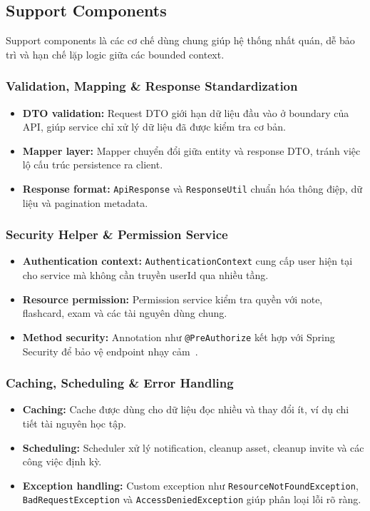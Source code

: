 \subsection{Support Components}
\label{subsec:support-components}

Support components là các cơ chế dùng chung giúp hệ thống nhất quán, dễ bảo trì và hạn chế lặp logic giữa các bounded context.

\subsubsection{Validation, Mapping \& Response Standardization}
\label{subsubsec:validation-mapping-response}

\begin{itemize}
    \item \textbf{DTO validation:} Request DTO giới hạn dữ liệu đầu vào ở boundary của API, giúp service chỉ xử lý dữ liệu đã được kiểm tra cơ bản.
    \item \textbf{Mapper layer:} Mapper chuyển đổi giữa entity và response DTO, tránh việc lộ cấu trúc persistence ra client.
    \item \textbf{Response format:} \texttt{ApiResponse} và \texttt{ResponseUtil} chuẩn hóa thông điệp, dữ liệu và pagination metadata.
\end{itemize}

\subsubsection{Security Helper \& Permission Service}
\label{subsubsec:security-permission-helper}

\begin{itemize}
    \item \textbf{Authentication context:} \texttt{AuthenticationContext} cung cấp user hiện tại cho service mà không cần truyền userId qua nhiều tầng.
    \item \textbf{Resource permission:} Permission service kiểm tra quyền với note, flashcard, exam và các tài nguyên dùng chung.
    \item \textbf{Method security:} Annotation như \texttt{@PreAuthorize} kết hợp với Spring Security để bảo vệ endpoint nhạy cảm~\cite{springsecurityjwt}.
\end{itemize}

\subsubsection{Caching, Scheduling \& Error Handling}
\label{subsubsec:caching-scheduling-error-handling}

\begin{itemize}
    \item \textbf{Caching:} Cache được dùng cho dữ liệu đọc nhiều và thay đổi ít, ví dụ chi tiết tài nguyên học tập.
    \item \textbf{Scheduling:} Scheduler xử lý notification, cleanup asset, cleanup invite và các công việc định kỳ.
    \item \textbf{Exception handling:} Custom exception như \texttt{ResourceNotFoundException}, \texttt{BadRequestException} và \texttt{AccessDeniedException} giúp phân loại lỗi rõ ràng.
\end{itemize}